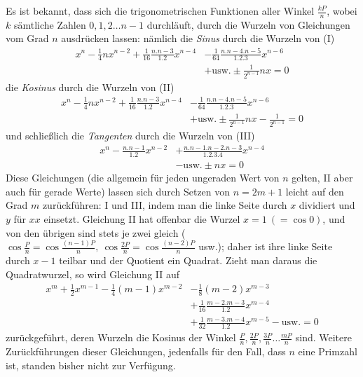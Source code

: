 Es ist bekannt, dass sich die trigonometrischen Funktionen aller Winkel \(\frac{kP}n\), wobei \(k\) sämtliche Zahlen \(0,\allowbreak 1,\allowbreak 2\ldots n-1\) durchläuft, durch die Wurzeln von Gleichungen vom Grad \(n\) ausdrücken lassen: nämlich die \textit{Sinus} durch die Wurzeln von (I) \[\begin{aligned}
x^n-\frac14nx^{n-2}+\frac1{16}\frac{n.n-3}{1.2}x^{n-4}
&-\frac1{64}\frac{n.n-4.n-5}{1.2.3}x^{n-6}\\
&+\mathrm{usw.}\pm\frac1{2^{n-1}}nx=0
\end{aligned}\] die \textit{Kosinus} durch die Wurzeln von (II) \[\begin{aligned}
x^n-\frac14nx^{n-2}+\frac1{16}\frac{n.n-3}{1.2}x^{n-4}
&-\frac1{64}\frac{n.n-4.n-5}{1.2.3}x^{n-6}\\
&+\mathrm{usw.}\pm\frac1{2^{n-1}}nx-\frac1{2^{n-1}}=0
\end{aligned}\] und schließlich die \textit{Tangenten} durch die Wurzeln von (III) \[\begin{aligned}
x^n-\frac{n.n-1}{1.2}x^{n-2}&+\frac{n.n-1.n-2.n-3}{1.2.3.4}x^{n-4}\\
&-\mathrm{usw.}\pm nx=0
\end{aligned}\] Diese Gleichungen (die allgemein für jeden ungeraden Wert von \(n\) gelten, II aber auch für gerade Werte) lassen sich durch Setzen von \(n=2m+1\) leicht auf den Grad \(m\) zurückführen: I und III, indem man die linke Seite durch \(x\) dividiert und \(y\) für \(xx\) einsetzt. Gleichung II hat offenbar die Wurzel \(x=1\ (=\cos0)\), und von den übrigen sind stets je zwei gleich (\(\cos\frac Pn=\cos\frac{(n-1)P}n,\allowbreak \ \cos\frac{2P}n=\cos\frac{(n-2)P}n\) usw.); daher ist ihre linke Seite durch \(x-1\) teilbar und der Quotient ein Quadrat. Zieht man daraus die Quadratwurzel, so wird Gleichung II auf \[\begin{aligned}
x^m+\frac12x^{m-1}-\frac14(m-1)x^{m-2}&-\frac18(m-2)x^{m-3}\\
&+\frac1{16}\frac{m-2.m-3}{1.2}x^{m-4}\\
&+\frac1{32}\frac{m-3.m-4}{1.2}x^{m-5}-\mathrm{usw.}=0
\end{aligned}\] zurückgeführt, deren Wurzeln die Kosinus der Winkel \(\frac Pn,\allowbreak \frac{2P}n,\allowbreak \frac{3P}n\ldots\frac{mP}n\) sind. Weitere Zurückführungen dieser Gleichungen, jedenfalls für den Fall, dass \(n\) eine Primzahl ist, standen bisher nicht zur Verfügung.

